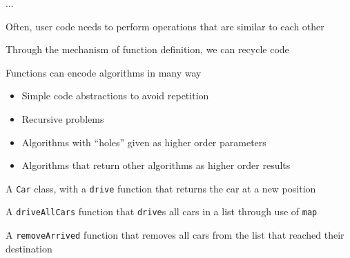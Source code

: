 \documentclass{beamer}
\begin{document}
\begin{slide}{
\item ...
}\end{slide}

\begin{slide}{
\item Often, user code needs to perform operations that are similar to each other
\item Through the mechanism of function definition, we can recycle code
\item Functions can encode algorithms in many way
\begin{itemize}
\item Simple code abstractions to avoid repetition
\item Recursive problems
\item Algorithms with ``holes'' given as higher order parameters
\item Algorithms that return other algorithms as higher order results
\end{itemize}
}\end{slide}

\begin{slide}{
\item A \texttt{Car} class, with a \texttt{drive} function that returns the car at a new position
\item A \texttt{driveAllCars} function that \texttt{drive}s all cars in a list through use of \texttt{map}
\item A \texttt{removeArrived} function that removes all cars from the list that reached their destination
}\end{slide}

\begin{thankyou}
\end{thankyou}
\end{document}
